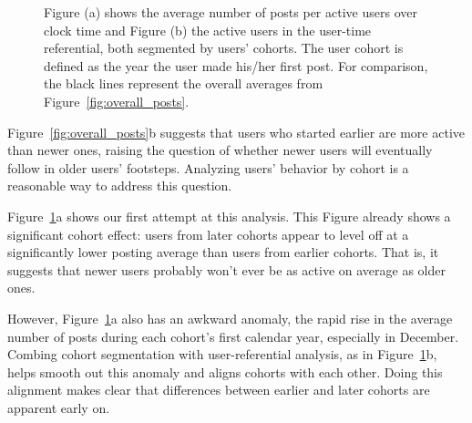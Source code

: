 \begin{figure}[!tb]
\caption{Figure (a) shows the average number of posts per active users over clock time and Figure (b) the active users in the user-time referential, both segmented by users' cohorts. The user cohort is defined as the year the user made his/her first post.  For comparison, the black lines represent the overall averages from Figure~\ref{fig:overall_posts}.}
\label{fig:avr_posts_per_user_over_time_cohorts}
\end{figure}

Figure~\ref{fig:overall_posts}b suggests that users who started earlier are more active than newer ones, raising the question of whether newer users
will eventually follow in older users' footsteps.  Analyzing users' behavior by cohort is a reasonable way to address this question.  

Figure~\ref{fig:avr_posts_per_user_over_time_cohorts}a shows our first attempt at this analysis.  This Figure already shows a significant cohort effect: users from later cohorts appear to level off at a significantly lower posting average than users from earlier cohorts.  That is, it suggests that newer users probably won't ever be as active on average as older ones.

However, Figure~\ref{fig:avr_posts_per_user_over_time_cohorts}a also has an awkward anomaly, the rapid rise in the average number of posts during each cohort's first calendar year, especially in December.  
Combing cohort segmentation with user-referential analysis, as in Figure~\ref{fig:avr_posts_per_user_over_time_cohorts}b, helps smooth out this anomaly and aligns cohorts with each other.  Doing this alignment makes clear that differences between earlier and later cohorts are apparent early on.



